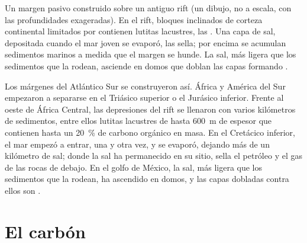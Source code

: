 \begin{omfigure}

{\small Un margen pasivo construido sobre un antiguo rift (un dibujo, no a
escala, con las profundidades exageradas). En el rift, bloques inclinados de
corteza continental limitados por  contienen lutitas
lacustres, las . Una capa de sal, depositada cuando el mar
joven se evaporó, las sella; por encima se acumulan sedimentos marinos a
medida que el margen se hunde. La sal, más ligera que los sedimentos que la
rodean, asciende en domos que doblan las capas formando .}
\end{omfigure}

Los márgenes del Atlántico Sur se construyeron así. África y América del Sur
empezaron a separarse en el Triásico superior o el Jurásico inferior. Frente
al oeste de África Central, las depresiones del rift se llenaron con varios
kilómetros de sedimentos, entre ellos lutitas lacustres de hasta
\qty{600}{m} de espesor que contienen hasta un \qty{20}{\percent} de carbono
orgánico en masa. En el Cretácico inferior, el mar empezó a entrar, una y otra
vez, y se evaporó, dejando más de un kilómetro de sal; donde la sal ha
permanecido en su sitio, sella el petróleo y el gas de las rocas de debajo.
En el golfo de México, la sal, más ligera que los sedimentos que la rodean,
ha ascendido en domos, y las capas dobladas contra ellos son .

\section{El carbón}

